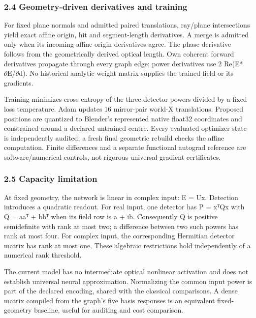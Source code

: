 \documentclass[
  10pt,
]{article}
\begin{document}
\hypertarget{geometry-driven-derivatives-and-training}{%
\subsubsection{2.4 Geometry-driven derivatives and
training}\label{geometry-driven-derivatives-and-training}}

For fixed plane normals and admitted paired translations, ray/plane
intersections yield exact affine origin, hit and segment-length
derivatives. A merge is admitted only when its incoming affine origin
derivatives agree. The phase derivative follows from the geometrically
derived optical length. Own coherent forward derivatives propagate
through every graph edge; power derivatives use 2 Re(E* ∂E/∂d). No
historical analytic weight matrix supplies the trained field or its
gradients.

Training minimizes cross entropy of the three detector powers divided by
a fixed loss temperature. Adam updates 16 mirror-pair world-X
translations. Proposed positions are quantized to Blender's represented
native float32 coordinates and constrained around a declared untrained
centre. Every evaluated optimizer state is independently audited; a
fresh final geometric rebuild checks the affine computation. Finite
differences and a separate functional autograd reference are
software/numerical controls, not rigorous universal gradient
certificates.

\hypertarget{capacity-limitation}{%
\subsubsection{2.5 Capacity limitation}\label{capacity-limitation}}

At fixed geometry, the network is linear in complex input: E = Ux.
Detection introduces a quadratic readout. For real input, one detector
has P = xᵀQx with Q = aaᵀ + bbᵀ when its field row is a + ib.
Consequently Q is positive semidefinite with rank at most two; a
difference between two such powers has rank at most four. For complex
input, the corresponding Hermitian detector matrix has rank at most one.
These algebraic restrictions hold independently of a numerical rank
threshold.

The current model has no intermediate optical nonlinear activation and
does not establish universal neural approximation. Normalizing the
common input power is part of the declared encoding, shared with the
classical comparisons. A dense matrix compiled from the graph's five
basis responses is an equivalent fixed-geometry baseline, useful for
auditing and cost comparison.
\end{document}
